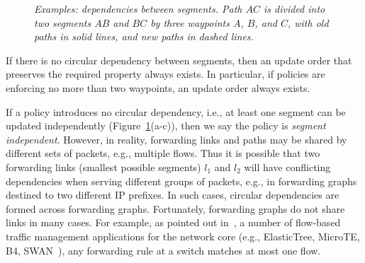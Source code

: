 \begin{figure}[!th]
  \vspace{-0.2in}
  \caption{\em \small Examples: dependencies between segments. Path $AC$ is divided into two segments $AB$ and $BC$ by three waypoints $A$, $B$, and $C$, with old paths in solid lines, and new paths in dashed lines.  }
  \vspace{-0.2in}
  \label{fig:circular}
\end{figure}

  \vspace{-0.1in}
\begin{theorem} If there is no circular dependency between segments, then an update order that preserves the required property always exists. 
In particular, if policies are enforcing no more than two waypoints,
an update order always exists. 
\end{theorem}
  \vspace{-0.1in}

If a policy introduces no circular dependency, 
i.e., at least one segment can be updated independently (Figure~\ref{fig:circular}(a-c)), 
then we say the policy is {\em segment independent}.
However, in reality, forwarding links and paths may be shared by different sets of packets, e.g., multiple flows. Thus it is possible that two forwarding links (smallest possible segments) $l_1$ and $l_2$ will have 
conflicting dependencies when serving different groups of packets, e.g., in forwarding graphs destined to two different IP prefixes. In such cases, circular dependencies are formed across forwarding graphs. 
Fortunately, forwarding graphs do not share links in many cases. 
For example, as pointed out in~\cite{jin2014dynamic}, a number of flow-based traffic management applications 
for the network core (e.g., ElasticTree, MicroTE, B4, SWAN~\cite{microte, heller2010elastictree, jain2013b4, Hong13}), any forwarding rule at a switch matches at most one flow.

